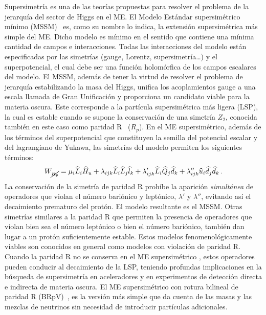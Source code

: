 Supersimetría \cite{Wess:1992cp,Martin:1997ns,Haber:1984rc} es una de las teorías
propuestas para resolver el problema de la jerarquía del sector de Higgs
en el ME. El Modelo Estándar supersimétrico mínimo (MSSM)~\cite{Fayet:1976et,
Fayet:1977yc,Fayet:1976cr,Nilles:1983ge} es, como su
nombre lo indica, la extensión supersimétrica más simple del ME.
Dicho modelo es mínimo en el sentido que contiene una mínima cantidad de campos
e interacciones.
Todas las interacciones del modelo están especificadas por las simetrías
(gauge, Lorentz, supersimetría\dots) y el superpotencial,
el cual debe ser una función holomórfica de los campos escalares del
modelo. El MSSM, además de tener la virtud de resolver el problema de jerarquía
estabilizando la masa del Higgs, unifica los acoplamientos gauge a una escala
llamada de Gran Unificación y proporciona un candidato viable para la materia
oscura. Este corresponde a la partícula supersimétrica más ligera (LSP), la
cual es estable cuando se supone la conservación de una simetría $Z_2$,
conocida también en este caso como paridad R~\cite{Ellis:1983ew} ($R_p$).
En el ME supersimétrico, además de los términos
del superpotencial que constituyen la semilla del potencial escalar y
del lagrangiano de Yukawa, las simetrías del modelo permiten los siguientes
términos:
\begin{equation}
  \label{eq:5}
  W_{\cancel{R_p}} = \mu_i\widehat{L}_i\widehat{H}_u + 
  \lambda_{i j k}\widehat{L}_i\widehat{L}_j\widehat{l}_k +
  \lambda'_{i j k}\widehat{L}_i\widehat{Q}_j\widehat{d}_k + 
  \lambda''_{ijk}\widehat{u}_i\widehat{d}_j\widehat{d}_k\,.
\end{equation}
La conservación de la simetría de paridad R prohíbe la aparición
\emph{simultánea} de operadores que violan el número bariónico y
leptónico, $\lambda'$ y $\lambda''$, evitando así el decaimiento
prematuro del protón. El modelo resultante es el MSSM.
Otras simetrías similares a la paridad R
que permiten la presencia de operadores que violan bien sea el número
leptónico o bien el número bariónico, también dan lugar a un protón
suficientemente estable. Estos modelos fenomenológicamente viables son
conocidos en general como modelos con violación de paridad R. Cuando
la paridad R no se conserva en el ME supersimétrico
\cite{Barbier:2004ez}, estos operadores pueden conducir al decaimiento
de la LSP, teniendo profundas
implicaciones en la búsqueda de supersimetría en aceleradores y en 
experimentos de detección directa e indirecta de materia oscura. El
ME supersimétrico con rotura bilineal de paridad R
(BRpV)~\cite{Diaz:1997xc,Hirsch:2000ef,Diaz:2003as}, es la versión más simple que da cuenta de las masas y
las mezclas de neutrinos sin necesidad de introducir partículas
adicionales. 

